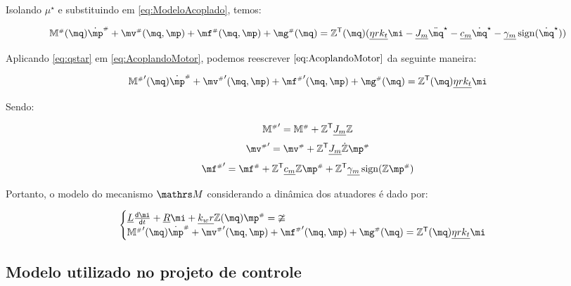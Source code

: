 \documentclass[a4paper,11pt,brazil,fleqn]{article}
\begin{document}
Isolando $\mu^\star$ e substituindo em \eqref{eq:ModeloAcoplado}, temos:

\begin{equation} \label{eq:AcoplandoMotor}
\mM\ssh(\mq) \dot{\mp}\ssh + \mv\ssh(\mq,\mp) + \mf\ssh(\mq,\mp) + \mg\ssh(\mq) = \mZ^\msT (\mq) (\underline{\eta r k_t} \mi - \underline{J_m} \ddot{\mq}^\star - \underline{c_m} \dot{\mq}^\star - \underline{\gamma_m} \sign(\dot{\mq}^\star) )
\end{equation}

Aplicando \eqref{eq:qstar} em \eqref{eq:AcoplandoMotor}, podemos reescrever $\eqref{eq:AcoplandoMotor}$ da seguinte maneira:

\begin{equation}
{\mM\ssh}'(\mq) \dot{\mp}\ssh + {\mv\ssh}'(\mq,\mp) + {\mf\ssh}'(\mq,\mp) + {\mg\ssh}(\mq) = \mZ^\msT (\mq) \underline{\eta r k_t} \mi
\end{equation}

Sendo:

\begin{equation}
{\mathbb{M}^{\scriptscriptstyle \#}}' = \mathbb{M}^{\scriptscriptstyle \#} + \mathbb{Z}^{\mathsf{T}} \underline{J_m} \mathbb{Z}
\end{equation}
\begin{equation}
{\mv\ssh}' = \mv\ssh + \mZ^\msT \underline{J_m} \dot{\mZ}\mp\ssh
\end{equation}
\begin{equation}
{\mf\ssh}' = \mf\ssh + \mZ^\msT \underline{c_m} \mZ \mp\ssh + \mZ^\msT \underline{\gamma_m} \sign(\mZ \mp\ssh)
\end{equation}

Portanto, o modelo do mecanismo $\ssM$ considerando a din\^amica dos atuadores \'e dado por:

\begin{equation} \label{eq:MotorAcoplado}
\begin{cases}
\underline{L} \frac{\dd \mi}{\dd t} + \underline{R} \mi + \underline{k_w r} \mZ (\mq) \mp\ssh = \mup
\\
{\mM\ssh}'(\mq) \dot{\mp}\ssh + {\mv\ssh}'(\mq,\mp) + {\mf\ssh}'(\mq,\mp) + {\mg\ssh}(\mq) = \mZ^\msT (\mq) \underline{\eta r k_t} \mi
\end{cases}
\end{equation}

\subsection{Modelo utilizado no projeto de controle}\label{S04-5}
\end{document}
